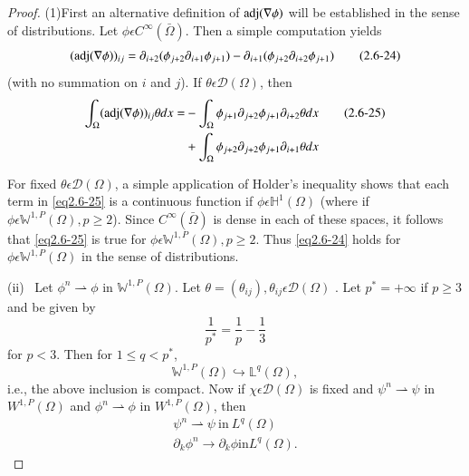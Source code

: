 \begin{proof}
(1)\pageoriginale First an alternative definition of $\operatorname{adj}  (\nabla \phi)$
  will be established in the sense of distributions. Let $\phi
  \epsilon C^\infty (\bar{\Omega})$. Then a simple computation
  yields 
  \begin{equation*}
    (\operatorname{adj} (\nabla \phi))_{ij}=\partial_{i+2}(\phi_{j+2}
    \partial_{i+1}\phi_{j+1})-\partial_{i+1}(\phi_{j+2}
    \partial_{i+2}\phi_{j+1}) \tag{2.6-24} \label{eq2.6-24}
  \end{equation*}
  (with no summation on $i$ and $j$). If $\theta \epsilon
  \mathcal{D}(\Omega)$, then 
  \begin{align*}
    \int_\Omega (\operatorname{adj}(\nabla \phi))_{ij} \theta dx = & -
    \int_\Omega \phi_{j+1} \partial_{j+2} \phi_{j+1}\partial_{i+2}\theta
    dx \tag{2.6-25}\label{eq2.6-25}\\ 
    & + \int_\Omega \phi_{j+2} \partial_{j+2}
    \phi_{j+1}\partial_{i+1}\theta dx  
  \end{align*}
  
  For fixed $\theta \epsilon \mathcal{D}(\Omega)$, a simple
  application of Holder's inequality shows that each term
  in \eqref{eq2.6-25} is a continuous function if
  $\phi \epsilon \mathbb{H}^1(\Omega)$ 
  (where if $\phi \epsilon \mathbb{W}^{1,P}(\Omega), p \ge 2$). Since
  $C^\infty (\bar{\Omega})$ is dense in each of these spaces, it follows
  that \eqref{eq2.6-25} is true for $\phi \epsilon \mathbb{W}^{1,P}(\Omega),
  p \ge 2$. Thus \eqref{eq2.6-24} holds for $\phi \epsilon
  \mathbb{W}^{1,P}(\Omega)$ in the sense of distributions.

\smallskip
(ii)~ Let $\phi^{n}\rightharpoonup \phi$ in
  $\mathbb{W}^{1,P}(\Omega)$. Let $\theta = (\theta_{ij}),\theta_{ij}
  \epsilon \mathcal{D}(\Omega)$ . Let $p^* =+\infty$ if $p \ge 3$ and
  be given by 
  \begin{equation*}
    \frac{1}{p^*}=\frac{1}{p}-\frac{1}{3} \tag{2.6-26}\label{eq2.6-26}
  \end{equation*}
  for $p< 3$. Then for $1 \le q < p^*$,
  \begin{equation*}
    \mathbb{W}^{1,P}(\Omega)\hookrightarrow \mathbb{L}^q
  (\Omega), \tag{2.6-27}\label{eq2.6-27} 
  \end{equation*}
  i.e., the above inclusion is compact. Now if $\chi \epsilon
  \mathcal{D}(\Omega)$ is fixed and $\psi^n \rightharpoonup \psi $ in
  $W^{1,P}(\Omega)$ and $\phi^n \rightharpoonup \phi$ in
  $W^{1,P}(\Omega)$, then 
  \begin{gather*}
    \psi^n \rightharpoonup \psi ~\text{in}~ L^q(\Omega)\\
    \partial_k \phi^n \to \partial_k \phi \text{in} L^q(\Omega).
  \end{gather*}\pageoriginale
  

\end{proof}
